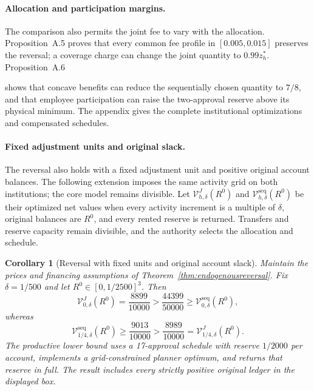 \documentclass[ecta,draft]{econsocart}
\newtheorem{corollary}[theorem]{Corollary}
\theoremstyle{definition}
\theoremstyle{definition}
\begin{document}
\paragraph{Allocation and participation margins.}
The comparison also permits the joint fee to vary with the allocation.
Proposition~A.5%
 proves that every common fee profile
in $[0.005,0.015]$ preserves the reversal; a coverage charge can change the
joint quantity to $0.99z_h^*$. Proposition~A.6%

shows that concave benefits can reduce the sequentially chosen quantity to
$7/8$, and that employee participation can raise the two-approval reserve
above its physical minimum. The appendix gives the complete institutional
optimizations and compensated schedules.

\paragraph{Fixed adjustment units and original slack.}
The reversal also holds with a fixed adjustment unit and positive
original account balances. The following extension imposes the same activity grid
on both institutions; the core model remains divisible. Let
$\mathcal V^J_{h,\delta}(R^0)$ and
$\mathcal V^{\mathrm{seq}}_{h,\delta}(R^0)$ be their optimized net values
when every activity increment is a multiple of $\delta$, original
balances are $R^0$, and every rented reserve is returned. Transfers and
reserve capacity remain divisible, and the authority selects the
allocation and schedule.

\begin{corollary}[Reversal with fixed units and original account slack]
\label{cor:gridrobustreversal}
Maintain the prices and financing assumptions of
Theorem~\ref{thm:endogenousreversal}. Fix $\delta=1/500$ and let
$R^0\in[0,1/2500]^3$. Then
\[
 \mathcal V^J_{0,\delta}(R^0)=\frac{8899}{10000}
 >\frac{44399}{50000}
 \geq\mathcal V^{\mathrm{seq}}_{0,\delta}(R^0),
\]
whereas
\[
 \mathcal V^{\mathrm{seq}}_{1/4,\delta}(R^0)
 \geq\frac{9013}{10000}
 >\frac{8989}{10000}
 =\mathcal V^J_{1/4,\delta}(R^0).
\]
The productive lower bound uses a 17-approval schedule with reserve
$1/2000$ per account, implements a grid-constrained planner optimum,
and returns that reserve in full. The result includes every strictly
positive original ledger in the displayed box.
\end{corollary}
\end{document}
